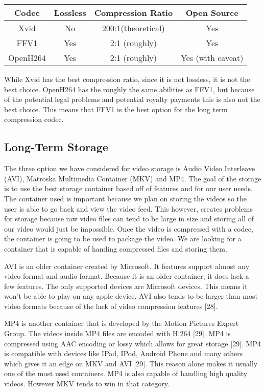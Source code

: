 \documentclass[letterpaper,10pt,onecolumn,draftclsnofoot]{IEEEtran}
\begin{document}
\begin{center}
	\begin{tabular}{|c|c|c|c|}
		\hline
		\textbf{Codec} & \textbf{Lossless} & \textbf{Compression Ratio} & \textbf{Open Source} \\
		\hline
		Xvid & No & 200:1(theoretical) & Yes \\
		\hline
		FFV1 & Yes & 2:1 (roughly) & Yes \\
		\hline
		OpenH264 & Yes & 2:1 (roughly) & Yes (with caveat) \\
		\hline
		
	\end{tabular}
\end{center}

While Xvid has the best compression ratio, since it is not lossless, it is not the best choice.
OpenH264 has the roughly the same abilities as FFV1, but because of the potential legal problems and potential royalty payments this is also not the best choice.
This means that FFV1 is the best option for the long term compression codec.

\newpage
\subsection{Long-Term Storage} %

The three option we have considered for video storage is Audio Video Interleave (AVI), Matroska Multimedia Container (MKV) and MP4.
The goal of the storage is to use the best storage container based off of features and for our user needs.
The container used is important because we plan on storing the videos so the user is able to go back and view the video feed.
This however, creates problems for storage because raw video files can tend to be large in size and storing all of our video would just be impossible.
Once the video is compressed with a codec, the container is going to be used to package the video.
We are looking for a container that is capable of handing compressed files and storing them.

AVI is an older container created by Microsoft. It features support almost any video format and audio format.
Because it is an older container, it does lack a few features.
The only supported devices are Microsoft devices.
This means it won't be able to play on any apple device.
AVI also tends to be larger than most video formats because of the lack of video compression features [28].

MP4 is another container that is developed by the Motion Pictures Expert Group.
The videos inside MP4 files are encoded with H.264 [29].
MP4 is compressed using AAC encoding or lossy which allows for great storage [29].
MP4 is compatible with devices like IPad, IPod, Android Phone and many others which gives it an edge on MKV and AVI [29].
This reason alone makes it usually one of the most used containers.
MP4 is also capable of handling high quality videos.
However MKV tends to win in that category.
\end{document}
